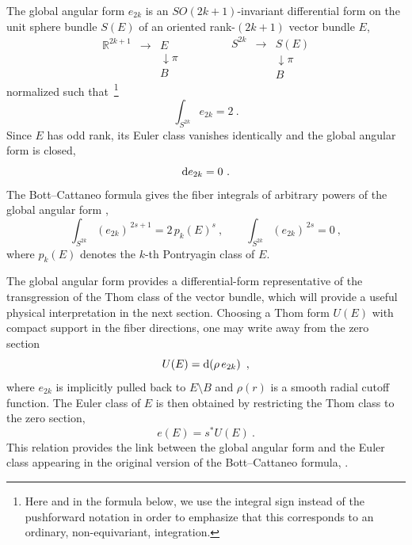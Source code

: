 \documentclass[11pt,a4paper]{article}
\theoremstyle{definition}
\theoremstyle{identity}
\theoremstyle{remark}
\newcommand{\be}{\begin{equation}}
\newcommand{\ee}{\end{equation}}
\begin{document}
The global angular form $e_{2k}$ is an $SO(2k+1)$-invariant differential
form on the unit sphere bundle $S(E)$ of an oriented rank-$(2k+1)$ vector bundle $E$,
\be
\begin{array}{ccc}
 \mathbb{R}^{2k+1} & \longrightarrow & E \\
 && \downarrow{\pi} \\
 && B
\end{array}
\qquad\qquad
\begin{array}{ccc}
 S^{2k} & \longrightarrow & S(E) \\
 && \downarrow{\pi} \\
 && B
\end{array}
\ee
normalized such that~\footnote{Here and in the formula below, we use the integral sign instead of the pushforward notation in order to emphasize that this corresponds to an ordinary, non-equivariant, integration.}
\begin{equation}
\label{eq:normalizationangular}
    \int_{S^{2k}} e_{2k}=2\ .
\end{equation}
Since $E$ has odd rank, its Euler class vanishes identically and the global
angular form is closed,
\begin{equation}
    {\rm d}e_{2k}=0\ .
\end{equation}
The Bott--Cattaneo formula gives the fiber integrals of arbitrary powers of the
global angular form \cite{1997dg.ga,Harvey:1998bx,Freed:1998tg},
\begin{equation}
\label{eq:BCformula}
    \int_{S^{2k}}\left(e_{2k}\right)^{\,2s+1}
    =2\,p_k(E)^s\ ,
    \qquad
    \int_{S^{2k}}\left(e_{2k}\right)^{\,2s}=0\ ,
\end{equation}
where $p_k(E)$ denotes the $k$-th Pontryagin class of $E$.

The global angular form provides a differential-form representative of the
transgression of the Thom class of the vector bundle, which will provide a
useful physical interpretation in the next section. Choosing a Thom form
$U(E)$ with compact support in the fiber directions, one may write away from
the zero section
\begin{equation}
\label{eq:Thomform}
    U(E)={\rm d}\!\left(\rho\,e_{2k}\right)\ ,
\end{equation}
where $e_{2k}$ is implicitly pulled back to $E\setminus B$ and
$\rho(r)$ is a smooth radial cutoff function. The Euler class of $E$ is then
obtained by restricting the Thom class to the zero section,
\begin{equation}
    e(E)=s^*U(E)\ .
\end{equation}
This relation provides the link between the global angular form and the
Euler class appearing in the original version of the Bott--Cattaneo formula, \cite{1997dg.ga}.
\end{document}
